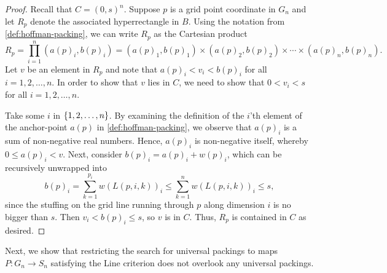 \begin{proof}
Recall that $C = (0, s)^n$. Suppose $p$ is a grid point coordinate in $G_n$ and let $R_p$ denote the associated hyperrectangle in $B$. Using the notation from \cref{def:hoffman-packing}, we can write $R_p$ as the Cartesian product
\[
R_p = \prod_{i = 1}^n (a(p)_i, b(p)_i)
= (a(p)_1, b(p)_1) \times (a(p)_2, b(p)_2) \times \dotsb \times (a(p)_n, b(p)_n).
\]
Let $v$ be an element in $R_p$ and note that $a(p)_i < v_i < b(p)_i$ for all $i = 1, 2, \dotsc, n$. In order to show that $v$ lies in $C$, we need to show that $0 < v_i < s$ for all $i = 1, 2, \dotsc, n$.

Take some $i$ in $\left\{ 1, 2, \dotsc, n \right\}$. By examining the definition of the $i$'th element of the anchor-point $a(p)$ in \cref{def:hoffman-packing}, we observe that $a(p)_i$ is a sum of non-negative real numbers. Hence, $a(p)_i$ is non-negative itself, whereby $0 \leq a(p)_i < v$. Next, consider $b(p)_i = a(p)_i + w(p)_i$, which can be recursively unwrapped into
\[
b(p)_i = \sum_{k = 1}^{p_i} w(L(p, i, k))_i \leq \sum_{k = 1}^{n} w(L(p, i, k))_i \leq s,
\]
since the stuffing on the grid line running through $p$ along dimension $i$ is no bigger than $s$. Then $v_i < b(p)_i \leq s$, so $v$ is in $C$. Thus, $R_p$ is contained in $C$ as desired.
\end{proof}

\noindent Next, we show that restricting the search for universal packings to maps $P\colon G_n \to S_n$ satisfying the Line criterion  does not overlook any universal packings.

